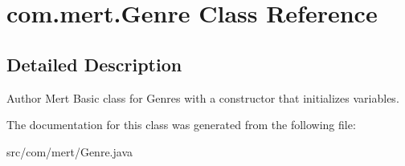 \hypertarget{classcom_1_1mert_1_1_genre}{}\section{com.\+mert.\+Genre Class Reference}
\label{classcom_1_1mert_1_1_genre}


\subsection{Detailed Description}
\begin{DoxyAuthor}{Author}
Mert Basic class for Genres with a constructor that initializes variables. 
\end{DoxyAuthor}


The documentation for this class was generated from the following file\+:\begin{DoxyCompactItemize}
\item 
src/com/mert/Genre.\+java\end{DoxyCompactItemize}
